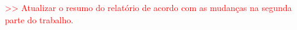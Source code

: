 \documentclass[a4paper,11pt]{scrreprt}
\begin{document}



\makecover



\renewenvironment{abstract}
 {\par\noindent\textbf{\Large\abstractname}\par\bigskip}
 {}

\begin{flushleft}
\begin{abstract}

    \textcolor{red}{>> Atualizar o resumo do relatório de acordo com as mudanças na segunda parte do trabalho.}

\end{abstract}
\end{flushleft}

\pagebreak



\renewcommand{\contentsname}{Índice}
\renewcommand{\listfigurename}{Índice de Figuras}

\begin{minipage}{\textwidth}
\tableofcontents
\listoffigures
\end{minipage}


\end{document}
